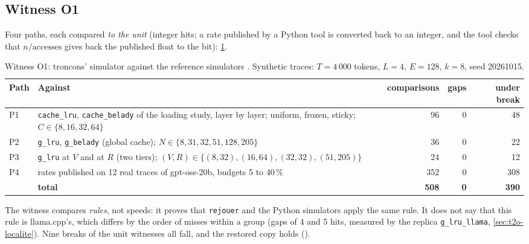 \subsection{Witness O1}

Four paths, each compared \emph{to the unit} (integer hits; a rate published by a Python tool is converted back to an integer, and the tool checks that $n/\text{accesses}$ gives back the published float to the bit): \cref{tab:t2o-o1}.

\begin{table}[ht]
\centering\small
\caption[Witness O1]{Witness O1: troncons' simulator against the reference simulators \mes. Synthetic traces: $T = 4\,000$ tokens, $L = 4$, $E = 128$, $k = 8$, seed 20261015.}
\label{tab:t2o-o1}
\begin{tabularx}{\linewidth}{@{}lXrrr@{}}
\toprule
Path & Against & comparisons & gaps & under break \\
\midrule
P1 & \texttt{cache\_lru}, \texttt{cache\_belady} of the loading study, layer by layer; uniform, frozen, sticky; $C \in \{8, 16, 32, 64\}$ & 96 & 0 & 48 \\
P2 & \texttt{g\_lru}, \texttt{g\_belady} (global cache); $N \in \{8, 31, 32, 51, 128, 205\}$ & 36 & 0 & 22 \\
P3 & \texttt{g\_lru} at $V$ and at $R$ (two tiers); $(V, R) \in \{(8, 32), (16, 64), (32, 32), (51, 205)\}$ & 24 & 0 & 12 \\
P4 & rates published on 12 real traces of gpt-oss-20b, budgets 5 to 40\,\% & 352 & 0 & 308 \\
\midrule
 & \textbf{total} & \textbf{508} & \textbf{0} & \textbf{390} \\
\bottomrule
\end{tabularx}
\end{table}

The witness compares \emph{rules}, not speeds: it proves that \texttt{rejouer} and the Python simulators apply the same rule. It does not say that this rule is llama.cpp's, which differs by the order of misses within a group (gaps of 4 and 5 hits, measured by the replica \texttt{g\_lru\_llama}, \cref{sec:t2o-localite}). Nine breaks of the unit witnesses all fall, and the restored copy holds ().

